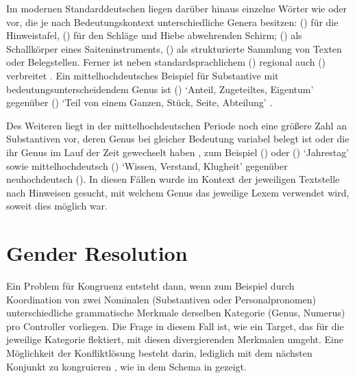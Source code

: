 Im modernen Standarddeutschen liegen darüber hinaus einzelne Wörter wie
 oder  vor, die je nach Bedeutungskontext
unterschiedliche Genera besitzen:  (\NeutI) für die
Hinweistafel,  (\MascI) für den Schläge und Hiebe abwehrenden
Schirm;  (\MascI) als Schallkörper eines Saiteninstruments,
 (\NeutI) als strukturierte Sammlung von Texten oder
Belegstellen. Ferner ist neben standardsprachlichem  (\FemI)
regional auch  (\MascI) verbreitet
\autocite[s.\,v.~\textit{der/die Butter}]{elspassmoeller2003}. Ein
mittelhochdeutsches Beispiel für Substantive mit
bedeutungs\-unterscheidendem Genus ist  (\MascI) `Anteil,
Zugeteiltes, Eigentum' gegenüber  (\NeutI) `Teil von einem
Ganzen, Stück, Seite, Abteilung' \autocite[s.\,v.~\textit{teil}]{lexer:mhdhwb}.

Des Weiteren liegt in der mittelhochdeutschen Periode
noch eine größere Zahl an Substantiven vor, deren Genus bei gleicher Bedeutung
variabel belegt ist oder die ihr Genus im Lauf der Zeit gewechselt haben
\autocite[157--166]{ksw2}, zum Beispiel  (\FemI) oder  (\NeutI) `Jahrestag' sowie mittel\-hoch\-deutsch
 (\FemI) `Wissen, Verstand, Klugheit'
\autocite[vgl.][s.\,v.~\textit{witze}]{lexer:mhdhwb} gegenüber
neu\-hoch\-deutsch  (\MascI). In diesen Fällen
wurde im Kontext der jeweiligen Text\-stelle nach Hinweisen gesucht, mit
welchem Genus das jeweilige Lexem verwendet wird, soweit dies möglich war.

\section{Gender Resolution}
\label{sec:gendres}

Ein Problem für Kongruenz entsteht dann, wenn zum Beispiel durch Koordination
von zwei Nominalen (Substantiven oder Personalpronomen) unterschiedliche
grammatische Merkmale derselben Kategorie (Genus, Numerus) pro Controller
vorliegen. Die Frage in diesem Fall ist, wie ein Target, das für die jeweilige
Kategorie flektiert, mit diesen divergierenden Merkmalen umgeht. Eine
Möglichkeit der Konfliktlösung besteht darin, lediglich mit dem nächsten
Konjunkt zu kongruieren \autocites[;
vgl.][179--180]{corbett1983}[168--170]{corbett2006}, wie in dem Schema in
 gezeigt.

